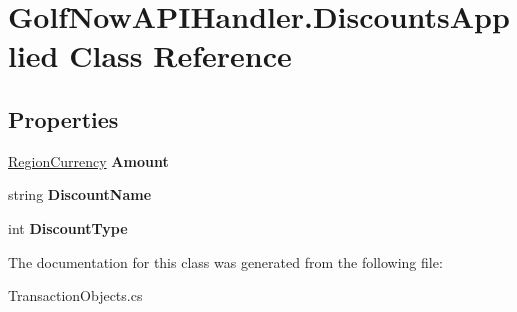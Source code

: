 \hypertarget{class_golf_now_a_p_i_handler_1_1_discounts_applied}{}\section{Golf\+Now\+A\+P\+I\+Handler.\+Discounts\+Applied Class Reference}
\label{class_golf_now_a_p_i_handler_1_1_discounts_applied}
\subsection*{Properties}
\begin{DoxyCompactItemize}
\item 
\mbox{\label{class_golf_now_a_p_i_handler_1_1_discounts_applied_a5d5c7cfefc5f6e3421797fbf5d5ff5b3}} 
\mbox{\hyperlink{class_golf_now_a_p_i_handler_1_1_region_currency}{Region\+Currency}} {\bfseries Amount}
\item 
\mbox{\label{class_golf_now_a_p_i_handler_1_1_discounts_applied_af8225931f46869175a321dec4826b63f}} 
string {\bfseries Discount\+Name}
\item 
\mbox{\label{class_golf_now_a_p_i_handler_1_1_discounts_applied_a490c630205026d19a4278318c32bd8c1}} 
int {\bfseries Discount\+Type}
\end{DoxyCompactItemize}


The documentation for this class was generated from the following file\+:\begin{DoxyCompactItemize}
\item 
Transaction\+Objects.\+cs\end{DoxyCompactItemize}
